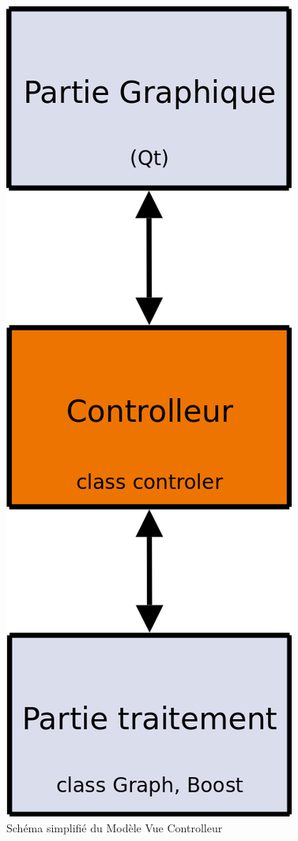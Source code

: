 \begin{figure}[H]
\begin{center}
        \includegraphics[height=0.3\textheight]{./schema/mvcScheme.png}
\caption{Schéma simplifié du Modèle Vue Controlleur}
\label{mvc}
\end{center}
\end{figure}

